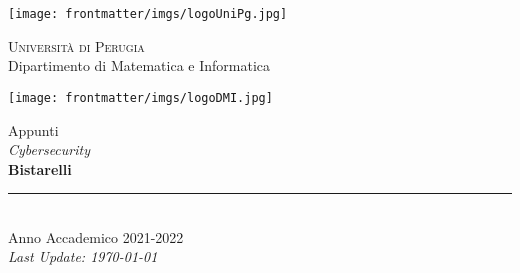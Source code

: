 
\thispagestyle{empty} %

\noindent %
\texttt{[image: frontmatter/imgs/logoUniPg.jpg]}
\begin{minipage}[b]{0.7\textwidth}
    \centering
    {\Large \textsc{Universit{\`a} di Perugia}}\\
    \vspace{0.4 em}
    {\large Dipartimento di Matematica e Informatica}
    \vspace{0.6 em}
\end{minipage}%
\texttt{[image: frontmatter/imgs/logoDMI.jpg]}

\vspace{8 em}

\begin{center}
    {\Huge Appunti}\\
    \vspace{1 em}
    {\Huge \textit{Cybersecurity}}\\
    \vspace{5 em}
    {\Huge \textbf{Bistarelli}}\\

    \vfill

    \rule{380pt}{.4pt}\\
    \vspace{1.2 em}
    \large{Anno Accademico 2021-2022}\\
    \vspace{.9 em}
    \small{\textit{Last Update: \today{}}}
\end{center}

